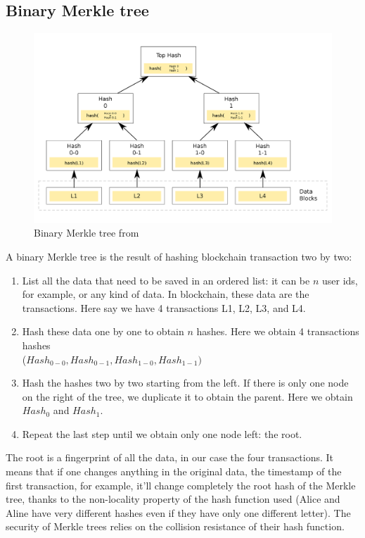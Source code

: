 \subsection{Binary Merkle tree}
\begin{figure}[H]
    \centering
\includegraphics[width=0.7\linewidth]{background/Merkle.png}
    \caption{Binary Merkle tree from \cite{wikimerkle}}
    \label{fig:Merkle}
\end{figure}
A binary Merkle tree is the result of hashing  blockchain transaction two by two: 
\begin{enumerate}
    \item List all the data that need to be saved in an ordered list: it can be $n$ user ids, for example, or any kind of data. In blockchain, these data are the transactions. Here say we have 4 transactions L1, L2, L3, and L4.
    \item Hash these data one by one to obtain $n$ hashes. Here we obtain 4 transactions hashes \\($Hash_{0-0},Hash_{0-1},Hash_{1-0},Hash_{1-1})$
    \item Hash the hashes two by two starting from the left. If there is only one node on the right of the tree, we duplicate it to obtain the parent. Here we obtain $Hash_0$ and $Hash_1$.
    \item Repeat the last step until we obtain only one node left: the root.
\end{enumerate}
The root is a fingerprint of all the data, in our case the four transactions. 
It means that if one changes anything in the original data, the timestamp of the first transaction, for example, it'll change completely the root hash of the Merkle tree, thanks to the non-locality property of the hash function used (Alice and Aline have very different hashes even if they have only one different letter). The security of Merkle trees relies on the collision resistance of their hash function.  

